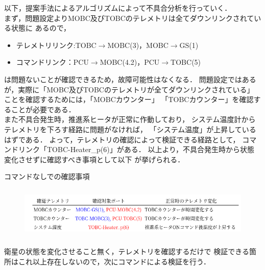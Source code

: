\documentclass[11pt]{article}
\begin{document}
以下，提案手法によるアルゴリズムによって不具合分析を行っていく．\\
まず，問題設定よりMOBC及びTOBCのテレメトリは全てダウンリンクされている状態に
あるので，
\begin{itemize}
   \item テレメトリリンク:TOBC$\rightarrow$MOBC(3)，MOBC$\rightarrow$GS(1)
   \item コマンドリンク：PCU$\rightarrow$MOBC(4.2)，PCU$\rightarrow$TOBC(5)
\end{itemize}
は問題ないことが確認できるため，故障可能性はなくなる．
問題設定ではあるが，実際に「MOBC及びTOBCのテレメトリが全てダウンリンクされている」
ことを確認するためには，「MOBCカウンター」
「TOBCカウンター」を確認することが必要である．\\
また不具合発生時，推進系ヒータが正常に作動しており，
システム温度計からテレメトリを下ろす経路に問題がなければ，
「システム温度」が上昇しているはずである．
よって，テレメトリの確認によって検証できる経路として，
コマンドリンク「TOBC-Heater\_p(6)」がある．
以上より，不具合発生時から状態変化させずに確認すべき事項として以下
が挙げられる．

\begin{table}[H]
   \centering
   \caption{コマンドなしでの確認事項} 
   \label{tab:check_list1}
\end{table}
\vspace{-2zh}
\begin{figure}[H]
   \centering
      \includegraphics[height=2.5cm]{figure/check_list_tel.png}
\end{figure}
衛星の状態を変化させること無く，テレメトリを確認するだけで
検証できる箇所はこれ以上存在しないので，次にコマンドによる検証を行う．
\end{document}
